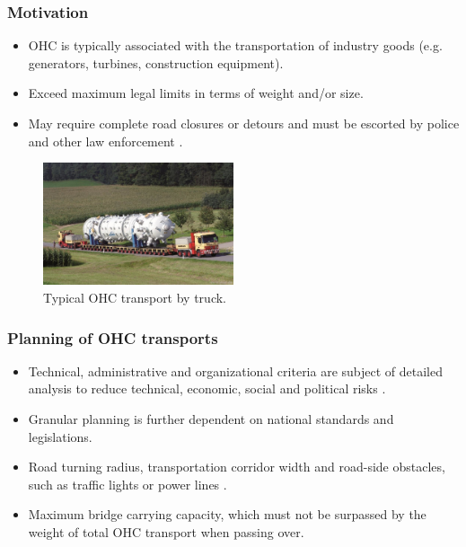 \documentclass{beamer}   %
\newcommand{\RNum}[1]{\uppercase\expandafter{\romannumeral #1\relax}}
\theoremstyle{break}
\begin{document}
  \begin{frame}
    \frametitle{Motivation \RNum{2}}
    \begin{itemize}
      \item OHC is typically associated with the transportation of industry goods (e.g. generators, turbines, construction equipment).
      \item Exceed maximum legal limits in terms of weight and/or size.
      \item May require complete road closures or detours and must be escorted by police and other law enforcement \cite{Luo.2021}.
    \end{itemize}

    \begin{figure}[!ht]
      \centering
      \includegraphics[width=0.5\textwidth]{../manuscript/figures/OHC.jpg}
      \caption{Typical OHC transport by truck.}
      \label{fig:higher level}
    \end{figure}

  \end{frame}

  \begin{frame}
    \frametitle{Planning of OHC transports  \RNum{1}}
    \begin{itemize}
      \item Technical, administrative and organizational criteria are subject of detailed analysis to reduce technical, economic, social and political risks \cite{Palsaitis.2012}.
      \item Granular planning is further dependent on national standards and legislations.
      \item Road turning radius, transportation corridor width and road-side obstacles, such as traffic lights or power lines \cite{PETRASKA.2018}.
      \item Maximum bridge carrying capacity, which must not be surpassed by the weight of total OHC transport when passing over.
    \end{itemize}
  \end{frame}
\end{document}
